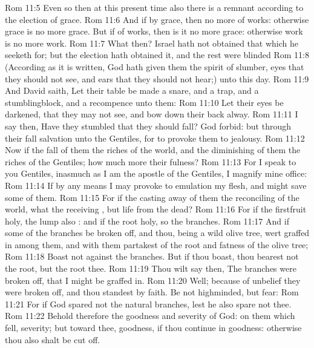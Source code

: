 \vs Rom 11:5 Even so then at this present time also there is a remnant according to the election of grace.
\vs Rom 11:6 And if by grace, then  no more of works: otherwise grace is no more grace. But if  of works, then is it no more grace: otherwise work is no more work.
\vs Rom 11:7 What then? Israel hath not obtained that which he seeketh for; but the election hath obtained it, and the rest were blinded
\vs Rom 11:8 (According as it is written, God hath given them the spirit of slumber, eyes that they should not see, and ears that they should not hear;) unto this day.
\vs Rom 11:9 And David saith, Let their table be made a snare, and a trap, and a stumblingblock, and a recompence unto them:
\vs Rom 11:10 Let their eyes be darkened, that they may not see, and bow down their back alway.
\vs Rom 11:11 I say then, Have they stumbled that they should fall? God forbid: but  through their fall salvation  unto the Gentiles, for to provoke them to jealousy.
\vs Rom 11:12 Now if the fall of them  the riches of the world, and the diminishing of them the riches of the Gentiles; how much more their fulness?
\vs Rom 11:13 For I speak to you Gentiles, inasmuch as I am the apostle of the Gentiles, I magnify mine office:
\vs Rom 11:14 If by any means I may provoke to emulation  my flesh, and might save some of them.
\vs Rom 11:15 For if the casting away of them  the reconciling of the world, what  the receiving , but life from the dead?
\vs Rom 11:16 For if the firstfruit  holy, the lump  also : and if the root  holy, so  the branches.
\vs Rom 11:17 And if some of the branches be broken off, and thou, being a wild olive tree, wert graffed in among them, and with them partakest of the root and fatness of the olive tree;
\vs Rom 11:18 Boast not against the branches. But if thou boast, thou bearest not the root, but the root thee.
\vs Rom 11:19 Thou wilt say then, The branches were broken off, that I might be graffed in.
\vs Rom 11:20 Well; because of unbelief they were broken off, and thou standest by faith. Be not highminded, but fear:
\vs Rom 11:21 For if God spared not the natural branches,  lest he also spare not thee.
\vs Rom 11:22 Behold therefore the goodness and severity of God: on them which fell, severity; but toward thee, goodness, if thou continue in  goodness: otherwise thou also shalt be cut off.
